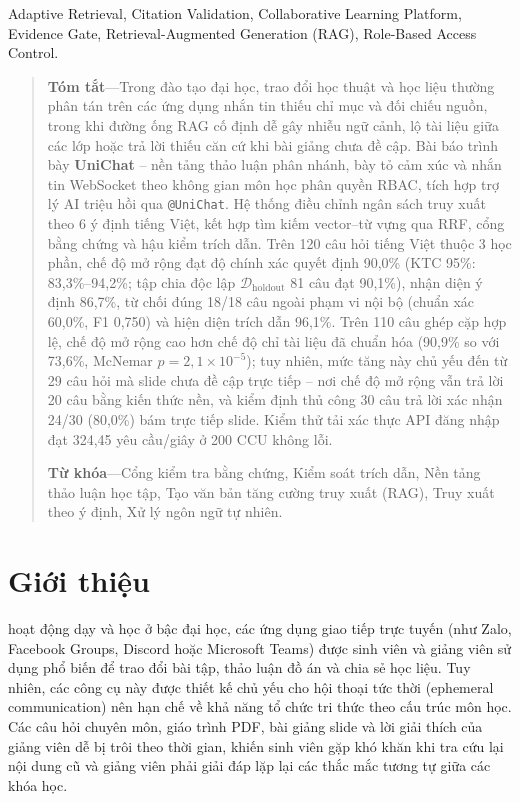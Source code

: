 \documentclass{IEEEtran}
\begin{document}
\begin{IEEEkeywords}
Adaptive Retrieval, Citation Validation, Collaborative Learning Platform, Evidence Gate, Retrieval-Augmented Generation (RAG), Role-Based Access Control.
\end{IEEEkeywords}

\vspace{0.15cm}
\begin{quote}
\small
\noindent\textbf{Tóm tắt}---Trong đào tạo đại học, trao đổi học thuật và học liệu thường phân tán trên các ứng dụng nhắn tin thiếu chỉ mục và đối chiếu nguồn, trong khi đường ống RAG cố định dễ gây nhiễu ngữ cảnh, lộ tài liệu giữa các lớp hoặc trả lời thiếu căn cứ khi bài giảng chưa đề cập. Bài báo trình bày \textbf{UniChat} -- nền tảng thảo luận phân nhánh, bày tỏ cảm xúc và nhắn tin WebSocket theo không gian môn học phân quyền RBAC, tích hợp trợ lý AI triệu hồi qua \texttt{@UniChat}. Hệ thống điều chỉnh ngân sách truy xuất theo 6 ý định tiếng Việt, kết hợp tìm kiếm vector--từ vựng qua RRF, cổng bằng chứng và hậu kiểm trích dẫn. Trên 120 câu hỏi tiếng Việt thuộc 3 học phần, chế độ mở rộng đạt độ chính xác quyết định 90,0\% (KTC 95\%: 83,3\%--94,2\%; tập chia độc lập $\mathcal{D}_{\text{holdout}}$ 81 câu đạt 90,1\%), nhận diện ý định 86,7\%, từ chối đúng 18/18 câu ngoài phạm vi nội bộ (chuẩn xác 60,0\%, F1 0,750) và hiện diện trích dẫn 96,1\%. Trên 110 câu ghép cặp hợp lệ, chế độ mở rộng cao hơn chế độ chỉ tài liệu đã chuẩn hóa (90,9\% so với 73,6\%, McNemar $p = 2{,}1 \times 10^{-5}$); tuy nhiên, mức tăng này chủ yếu đến từ 29 câu hỏi mà slide chưa đề cập trực tiếp -- nơi chế độ mở rộng vẫn trả lời 20 câu bằng kiến thức nền, và kiểm định thủ công 30 câu trả lời xác nhận 24/30 (80,0\%) bám trực tiếp slide. Kiểm thử tải xác thực API đăng nhập đạt 324,45 yêu cầu/giây ở 200 CCU không lỗi.

\vspace{0.12cm}
\noindent\textbf{Từ khóa}---Cổng kiểm tra bằng chứng, Kiểm soát trích dẫn, Nền tảng thảo luận học tập, Tạo văn bản tăng cường truy xuất (RAG), Truy xuất theo ý định, Xử lý ngôn ngữ tự nhiên.
\end{quote}
\vspace{0.15cm}

\section{Giới thiệu}
\label{sec:introduction}
 hoạt động dạy và học ở bậc đại học, các ứng dụng giao tiếp trực tuyến (như Zalo, Facebook Groups, Discord hoặc Microsoft Teams) được sinh viên và giảng viên sử dụng phổ biến để trao đổi bài tập, thảo luận đồ án và chia sẻ học liệu. Tuy nhiên, các công cụ này được thiết kế chủ yếu cho hội thoại tức thời (ephemeral communication) nên hạn chế về khả năng tổ chức tri thức theo cấu trúc môn học. Các câu hỏi chuyên môn, giáo trình PDF, bài giảng slide và lời giải thích của giảng viên dễ bị trôi theo thời gian, khiến sinh viên gặp khó khăn khi tra cứu lại nội dung cũ và giảng viên phải giải đáp lặp lại các thắc mắc tương tự giữa các khóa học.
\end{document}
